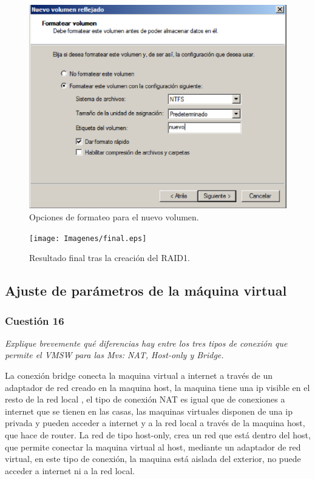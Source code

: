 \begin{figure}[H]
    \begin{center}
        \includegraphics[scale=0.6]{Imagenes/paso7.eps}
        \caption{Opciones de formateo para el nuevo volumen.}
        \label{fig16}
    \end{center}
\end{figure}

\begin{figure}[H]
    \begin{center}
        \advance\leftskip-2.1cm
        \texttt{[image: Imagenes/final.eps]}
        \caption{Resultado final tras la creación del RAID1.}
        \label{fig17}
    \end{center}
\end{figure}

\subsection{Ajuste de parámetros de la máquina virtual}
\subsubsection{Cuestión 16}
\textit{Explique brevemente qué diferencias hay entre los tres tipos de conexión que permite el VMSW para las Mvs: NAT, Host-only y Bridge.}\newline

La conexión bridge conecta la maquina virtual a internet a través de un adaptador de red creado en la maquina host, la maquina tiene una ip visible en el resto de la red local , el tipo de conexión NAT es igual que de conexiones a internet que se tienen en las casas, las maquinas virtuales disponen de una ip privada y pueden acceder a internet y a la red local a través de la maquina host, que hace de router. La red de tipo host-only, crea un red que está dentro del host, que permite conectar la maquina virtual al host, mediante un adaptador de red virtual, en este tipo de conexión, la maquina está aislada del exterior, no puede acceder a internet ni a la red local. \cite{red}

